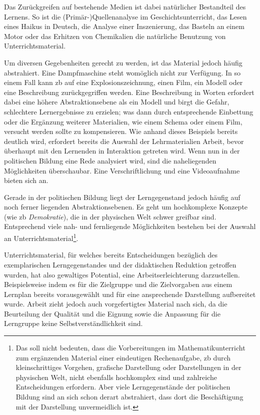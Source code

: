 Das Zurückgreifen auf bestehende Medien ist dabei natürlicher Bestandteil des Lernens. So ist die (Primär-)Quellenanalyse im Geschichtsunterricht, das Lesen eines Haikus in Deutsch, die Analyse einer Inszenierung, das Basteln an einem Motor oder das Erhitzen von Chemikalien die natürliche Benutzung von Unterrichtsmaterial. 


Um diversen Gegebenheiten gerecht zu werden, ist das Material jedoch häufig abstrahiert. Eine Dampfmaschine steht womöglich nicht zur Verfügung. In so einem Fall kann \gls{zb} auf eine Explosionszeichnung, einen Film, ein Modell oder eine Beschreibung zurückgegriffen werden. Eine Beschreibung in Worten erfordert dabei eine höhere Abstraktionsebene als ein Modell und birgt die Gefahr, schlechtere Lernergebnisse zu erzielen; was dann durch entsprechende Einbettung oder die Ergänzung weiterer Materialien, wie einem Schema oder einem Film, versucht werden sollte zu kompensieren. Wie anhand dieses Beispiels bereits deutlich wird, erfordert bereits die Auswahl der Lehrmaterialien Arbeit, bevor überhaupt mit den Lernenden in Interaktion getreten wird. 
Wenn nun in der politischen Bildung eine Rede analysiert wird, sind die naheliegenden Möglichkeiten überschaubar. Eine Verschriftlichung und eine Videoaufnahme bieten sich an. 

Gerade in der politischen Bildung liegt der Lerngegenstand jedoch häufig auf noch ferner liegenden Abstraktionsebenen. Es geht um hochkomplexe Konzepte (wie \gls{zb} \emph{Demokratie}), die in der physischen Welt schwer greifbar sind. Entsprechend viele nah- und fernliegende Möglichkeiten bestehen bei der Auswahl an Unterrichtsmaterial\footnote{Das soll nicht bedeuten, dass die Vorbereitungen im Mathematikunterricht zum ergänzenden Material einer eindeutigen Rechenaufgabe, \gls{zb} durch kleinschrittiges Vorgehen, grafische Darstellung oder Darstellungen in der physischen Welt, nicht ebenfalls hochkomplex sind und zahlreiche Entscheidungen erfordern. Aber viele Lerngegenstände der politischen Bildung sind an sich schon derart abstrahiert, dass dort die Beschäftigung mit der Darstellung unvermeidlich ist.}.

Unterrichtsmaterial, für welches bereits Entscheidungen bezüglich des exemplarischen Lerngegenstandes und der didaktischen Reduktion getroffen wurden, hat also gewaltiges Potential, eine Arbeitserleichterung darzustellen.
Beispielsweise indem es für die Zielgruppe und die Zielvorgaben aus einem Lernplan bereits vorausgewählt und für eine ansprechende Darstellung aufbereitet wurde.
Arbeit zieht jedoch auch vorgefertigtes Material nach sich, da die Beurteilung der Qualität und die Eignung sowie die Anpassung für die Lerngruppe keine Selbstverständlichkeit sind.


